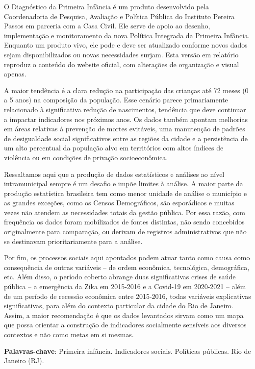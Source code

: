 \setlength{\absparsep}{18pt}
\begin{resumo}
O Diagnóstico da Primeira Infância é um produto desenvolvido pela Coordenadoria de Pesquisa, Avaliação e Política Pública do Instituto Pereira Passos em parceria com a Casa Civil. Ele serve de apoio ao desenho, implementação e monitoramento da nova Política Integrada da Primeira Infância. Enquanto um produto vivo, ele pode e deve ser atualizado conforme novos dados sejam disponibilizados ou novas necessidades surjam. Esta versão em relatório reproduz o conteúdo do website oficial, com alterações de organização e visual apenas.

A maior tendência é a clara redução na participação das crianças até 72 meses (0 a 5 anos) na composição da população. Esse cenário parece primariamente relacionado à significativa redução de nascimentos, tendência que deve continuar a impactar indicadores nos próximos anos. Os dados também apontam melhorias em áreas relativas à prevenção de mortes evitáveis, uma manutenção de padrões de desigualdade social significativos entre as regiões da cidade e a persistência de um alto percentual da população alvo em territórios com altos índices de violência ou em condições de privação socioeconômica.

Ressaltamos aqui que a produção de dados estatísticos e análises ao nível intramunicipal sempre é um desafio e impõe limites à análise. A maior parte da produção estatística brasileira tem como menor unidade de análise o município e as grandes exceções, como os Censos Demográficos, são esporádicos e muitas vezes não atendem as necessidades totais da gestão pública. Por essa razão, com frequência os dados foram mobilizados de fontes distintas, não sendo concebidos originalmente para comparação, ou derivam de registros administrativos que não se destinavam prioritariamente para a análise.

Por fim, os processos sociais aqui apontados podem atuar tanto como causa como consequência de outras variáveis – de ordem econômica, tecnológica, demográfica, etc. Além disso, o período coberto abrange duas significativas crises de saúde pública – a emergência da Zika em 2015-2016 e a Covid-19 em 2020-2021 – além de um período de recessão econômica entre 2015-2016, todas variáveis explicativas significativas, para além do contexto particular da cidade do Rio de Janeiro. Assim, a maior recomendação é que os dados levantados sirvam como um mapa que possa orientar a construção de indicadores socialmente sensíveis aos diversos contextos e não como metas em si mesmas.

\noindent\textbf{Palavras-chave}: Primeira infância. Indicadores sociais. Políticas públicas. Rio de Janeiro (RJ).
\end{resumo}

